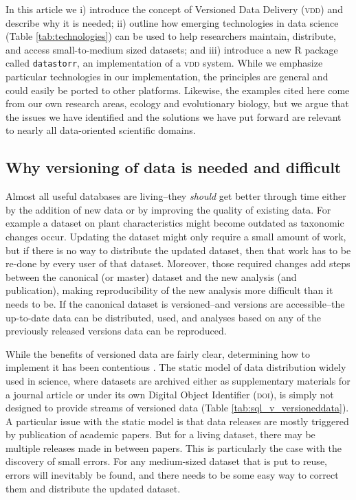 \documentclass[a4paper,11pt]{article}
\begin{document}
In this article we i) introduce the concept of Versioned Data Delivery (\textsc{vdd}) and describe why it is needed; ii) outline how emerging technologies in data science (Table \ref{tab:technologies}) can be used to help researchers maintain, distribute, and access small-to-medium sized datasets; and iii) introduce a new \textsc{R} package called \texttt{datastorr}, an implementation of a \textsc{vdd} system. While we emphasize particular technologies in our implementation, the principles are general and could easily be ported to other platforms. Likewise, the examples cited here come from our own research areas, ecology and evolutionary biology, but we argue that the issues we have identified and the solutions we have put forward are relevant to nearly all data-oriented scientific domains.

\subsection{Why versioning of data is needed and difficult}

Almost all useful databases are living--they \emph{should} get better
through time either by the addition of new data or by improving the
quality of existing data. For example a dataset on plant characteristics
might become outdated as taxonomic changes occur. Updating the dataset might only
require a small amount of work, but if there is no
way to distribute the updated dataset, then that work has to be re-done by
every user of that dataset. Moreover, those required changes add steps
between the canonical (or master) dataset and the new analysis (and publication),
making reproducibility of the new analysis more difficult than it needs
to be. If the canonical dataset is versioned--and versions are
accessible--the up-to-date data can be distributed, used, and analyses
based on any of the previously released versions data can be reproduced.  

While the benefits of versioned data are fairly clear, determining how to implement it has been contentious . The static model of data distribution widely used in science, where datasets are archived either as supplementary materials for a journal article
or under its own Digital Object Identifier (\textsc{doi}), is simply not designed to provide streams of versioned
data (Table \ref{tab:sql_v_versioneddata}). A particular issue with the static
model is that data releases are mostly triggered by publication of academic
papers. But for a living dataset, there may be multiple releases made in
between papers. This is particularly the case with the discovery of small
errors. For any medium-sized dataset that is put to reuse, errors will
inevitably be found, and there needs to be some easy  way to correct them and
distribute the updated dataset.
\end{document}

